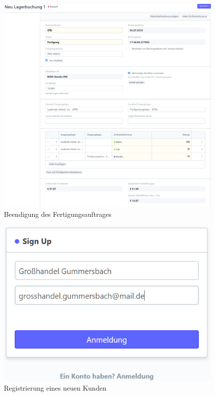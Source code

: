 \begin{figure}[H]
  \centering
  \includegraphics[width=\textwidth]{Bilder/Lagerbuchung2.PNG}
  \caption{Beendigung des Fertigungsauftrages}
  \label{fig:beenFertig}
\end{figure}
\begin{figure}[H]
  \centering
  \includegraphics[width=\textwidth]{Bilder/Registrierung.PNG}
  \caption{Registrierung eines neuen Kunden}
  \label{fig:regKunde}
\end{figure}
